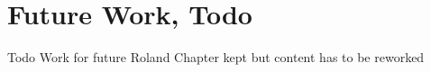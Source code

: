 \section{Future Work, Todo}

Todo
Work for future Roland
Chapter kept but content has to be reworked
